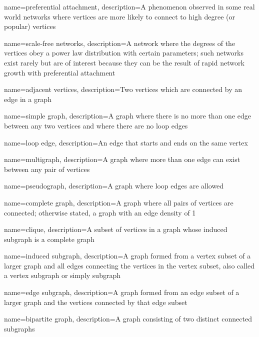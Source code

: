 {
    name={preferential attachment},
    description={A phenomenon observed in some real world networks where vertices are more likely to connect to high degree (or popular) vertices}
}

{
    name={scale-free networks},
    description={A network where the degrees of the vertices obey a power law distribution with certain parameters; such networks exist rarely but are of interest because they can be the result of rapid network growth with preferential attachment}
}

{
    name={adjacent vertices},
    description={Two vertices which are connected by an edge in a graph}
}

{
    name={simple graph},
    description={A graph where there is no more than one edge between any two vertices and where there are no loop edges}
}

{
    name={loop edge},
    description={An edge that starts and ends on the same vertex}
}

{
    name={multigraph},
    description={A graph where more than one edge can exist between any pair of vertices}
}

{
    name={pseudograph},
    description={A graph where loop edges are allowed}
}

{
    name={complete graph},
    description={A graph where all pairs of vertices are connected; otherwise stated, a graph with an edge density of 1}
}

{
    name={clique},
    description={A subset of vertices in a graph whose induced subgraph is a complete graph}
}

{
    name={induced subgraph},
    description={A graph formed from a vertex subset of a larger graph and all edges connecting the vertices in the vertex subset, also called a vertex subgraph or simply subgraph}
}

{
    name={edge subgraph},
    description={A graph formed from an edge subset of a larger graph and the vertices connected by that edge subset}
}

{
    name={bipartite graph},
    description={A graph consisting of two distinct connected subgraphs}
}

